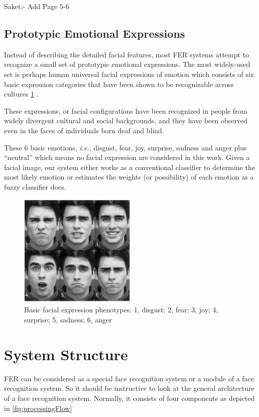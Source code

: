 \documentclass[12pt, twoside]{report}
\begin{document}
Saket:- Add Page 5-6

\subsection*{Prototypic Emotional Expressions}
Instead of describing the detailed facial features, most FER systems attempt to recognize a small set of prototypic emotional expressions. The most widely-used set is perhaps human universal facial expressions of emotion which consists of six basic expression categories that have been shown to be recognizable across cultures \ref{fig:facialPhenotypes} .

These expressions, or facial configurations have been recognized in people from widely divergent cultural and social backgrounds, and they have been observed even in the faces of individuals born deaf and blind.

These 6 basic emotions, \textit{i.e.}, disgust, fear, joy, surprise, sadness and anger plus ``neutral'' which means no facial expression are considered in this work. Given a facial image, our system either works as a conventional classifier to determine the most likely emotion or estimates the weights (or possibility) of each emotion as a fuzzy classifier does.

\begin{figure}[h]
    \centering
    \includegraphics[width=0.5\textwidth]{img/facialPhenotypes.png}
    \caption{Basic facial expression phenotypes. 1, disgust; 2, fear; 3, joy; 4, surprise; 5, sadness; 6, anger}
    \label{fig:facialPhenotypes}
\end{figure}

\section{System Structure}
FER can be considered as a special face recognition system or a module of a face recognition system. So it should be instructive to look at the general architecture of a face recognition system. Normally, it consists of four components as depicted in \ref{fig:processingFlow}
\end{document}
